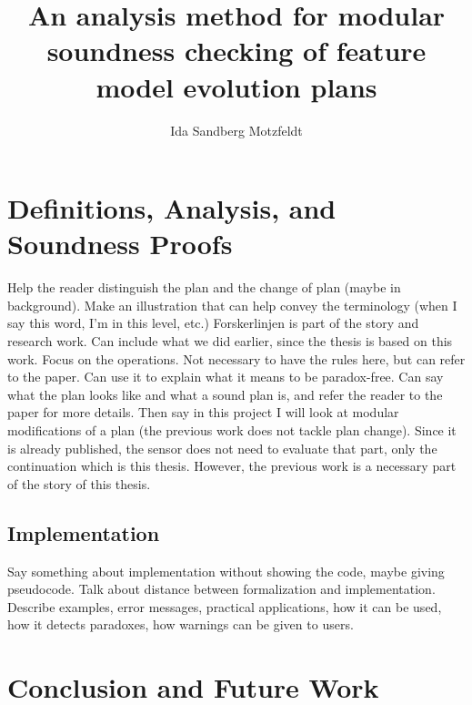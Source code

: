 \documentclass[a4paper,english]{ifimaster}
\title{An analysis method for modular soundness checking of feature model evolution plans}
\author{Ida Sandberg Motzfeldt}
\begin{document}
\duoforside[dept={Department of Informatics},
program={Informatics: Programming and System Architecture},
            option={Software},
long]

\frontmatter{}


\tableofcontents{}
\listoffigures{}

\mainmatter{}




\part{Definitions, Analysis, and Soundness Proofs}

Help the reader distinguish the plan and the change of plan (maybe in background). Make an illustration that can help convey the terminology (when I say this word, I'm in this level, etc.)
Forskerlinjen is part of the story and research work. Can include what we did earlier, since the thesis is based on this work. Focus on the operations. Not necessary to have the rules here, but can refer to the paper. Can use it to explain what it means to be paradox-free. Can say what the plan looks like and what a sound plan is, and refer the reader to the paper for more details. Then say in this project I will look at modular modifications of a plan (the previous work does not tackle plan change). Since it is already published, the sensor does not need to evaluate that part, only the continuation which is this thesis. However, the previous work is a necessary part of the story of this thesis.


 



\chapter{Implementation}  
\label{cha:implementation}

Say something about implementation without showing the code, maybe giving pseudocode. Talk about distance between formalization and implementation. Describe examples, error messages, practical applications, how it can be used, how it detects paradoxes, how warnings can be given to users.


\part{Conclusion and Future Work}



\backmatter{}

\printbibliography
\end{document}
